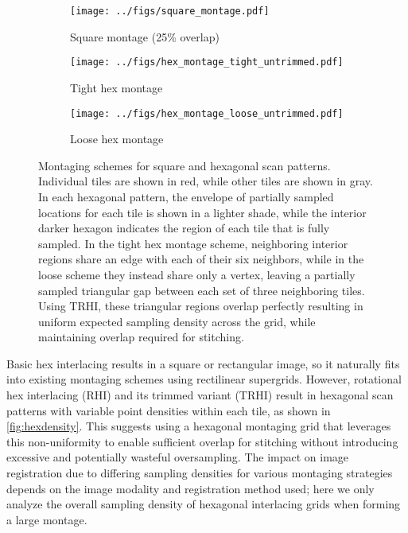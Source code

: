 \documentclass[aip, amsmath, amssymb, nobibnotes, nofootinbib, citeautoscript, reprint, superscriptaddress]{revtex4-1}
\begin{document}
    \begin{figure*}
        \centering
            \begin{subfigure}[b]{0.3\textwidth}
                \centering
                \texttt{[image: ../figs/square\_montage.pdf]}
                \caption{Square montage (25\% overlap)}
                \label{fig:square montage}
            \end{subfigure}
            \hfill
            \begin{subfigure}[b]{0.3\textwidth}
                \centering
                \texttt{[image: ../figs/hex\_montage\_tight\_untrimmed.pdf]}
                \caption{Tight hex montage}
                \label{fig:tight hex montage}
            \end{subfigure}
            \hfill
            \begin{subfigure}[b]{0.3\textwidth}
                \centering
                \texttt{[image: ../figs/hex\_montage\_loose\_untrimmed.pdf]}
                \caption{Loose hex montage}
                \label{fig:loose hex montage}
            \end{subfigure}
        \caption{Montaging schemes for square and hexagonal scan patterns.
        Individual tiles are shown in red, while other tiles are shown in gray.
        In each hexagonal pattern, the envelope of partially sampled locations for
        each tile is shown in a lighter shade, while the interior darker hexagon
        indicates the region of each tile that is fully sampled.
        In the tight hex montage scheme, neighboring interior regions share an edge
        with each of their six neighbors, while in the loose scheme they instead
        share only a vertex, leaving a partially sampled triangular gap between each
        set of three neighboring tiles.
        Using TRHI, these triangular regions overlap perfectly resulting in uniform
        expected sampling density across the grid, while maintaining overlap required for
        stitching.}
        \label{fig:montage} 
    \end{figure*}

    Basic hex interlacing results in a square or rectangular image, so it naturally
    fits into existing montaging schemes using rectilinear supergrids.
    However, rotational hex interlacing (RHI) and its trimmed variant (TRHI) result in
    hexagonal scan patterns with variable point densities within each tile, as shown
    in \autoref{fig:hexdensity}.
    This suggests using a hexagonal montaging grid that leverages this
    non-uniformity to enable sufficient overlap for stitching without introducing
    excessive and potentially wasteful oversampling.
    The impact on image registration due to differing sampling densities for various
    montaging strategies depends on the image modality and registration method used;
    here we only analyze the overall sampling density of hexagonal interlacing grids
    when forming a large montage.
\end{document}
